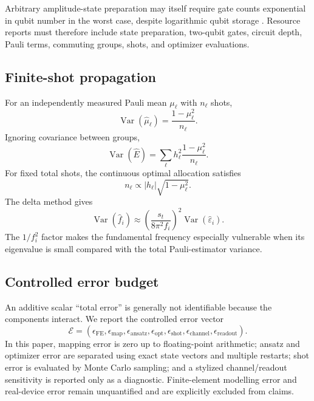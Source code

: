\documentclass{ieeeaccess}
\newcommand{\Var}{\operatorname{Var}}
\begin{document}
Arbitrary amplitude-state preparation may itself require gate counts exponential in qubit number in the worst case, despite logarithmic qubit storage \cite{PleschBrukner2011}. Resource reports must therefore include state preparation, two-qubit gates, circuit depth, Pauli terms, commuting groups, shots, and optimizer evaluations.

\subsection{Finite-shot propagation}

For an independently measured Pauli mean $\mu_\ell$ with $n_\ell$ shots,
\begin{equation}
\Var(\widehat\mu_\ell)=\frac{1-\mu_\ell^2}{n_\ell}.
\label{eq:paulivar}
\end{equation}
Ignoring covariance between groups,
\begin{equation}
\Var(\widehat E)=\sum_\ell h_\ell^2\frac{1-\mu_\ell^2}{n_\ell}.
\label{eq:energyvar}
\end{equation}
For fixed total shots, the continuous optimal allocation satisfies
\begin{equation}
n_\ell\propto |h_\ell|\sqrt{1-\mu_\ell^2}.
\label{eq:allocation}
\end{equation}
The delta method gives
\begin{equation}
\Var(\widehat f_i)\approx
\left(\frac{s_t}{8\pi^2f_i}\right)^2\Var(\widehat\varepsilon_i).
\label{eq:freqvar}
\end{equation}
The $1/f_i^2$ factor makes the fundamental frequency especially vulnerable when its eigenvalue is small compared with the total Pauli-estimator variance.

\subsection{Controlled error budget}

An additive scalar ``total error'' is generally not identifiable because the components interact. We report the controlled error vector
\begin{equation}
\mathcal E=
(\epsilon_{\mathrm{FE}},\epsilon_{\mathrm{map}},\epsilon_{\mathrm{ansatz}},
\epsilon_{\mathrm{opt}},\epsilon_{\mathrm{shot}},\epsilon_{\mathrm{channel}},
\epsilon_{\mathrm{readout}}).
\label{eq:errorvector}
\end{equation}
In this paper, mapping error is zero up to floating-point arithmetic; ansatz and optimizer error are separated using exact state vectors and multiple restarts; shot error is evaluated by Monte Carlo sampling; and a stylized channel/readout sensitivity is reported only as a diagnostic. Finite-element modelling error and real-device error remain unquantified and are explicitly excluded from claims.
\end{document}
